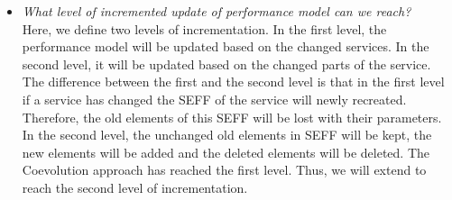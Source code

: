 \begin{itemize}
\item \textit{What level of incremented update of performance model can we reach?} \\
Here, we define two levels of incrementation. In the first level, the performance model will be updated based on the changed services. In the second level, it will be updated based on the changed parts of the service. The difference between the first and the second level is that in the first level if a service has changed the SEFF of the service will newly recreated. Therefore, the old elements of this SEFF will be lost with their parameters. In the second level, the unchanged old elements in SEFF will be kept, the new elements will be added and the deleted elements will be deleted. The Coevolution approach has reached the first level. Thus, we will extend to reach the second level of incrementation.


\end{itemize}
